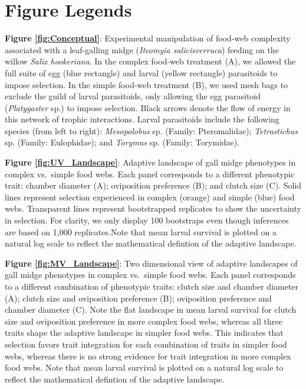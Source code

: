 \documentclass[11pt,]{article}
\begin{document}
\newpage 

\section{Figure Legends}\label{figure-legends}

\textbf{Figure \ref{fig:Conceptual}}: Experimental manipulation of
food-web complexity associated with a leaf-galling midge (\emph{Iteomyia
salicisverruca}) feeding on the willow \emph{Salix hookeriana}. In the
complex food-web treatment (A), we allowed the full suite of egg (blue
rectangle) and larval (yellow rectangle) parasitoids to impose
selection. In the simple food-web treatment (B), we used mesh bags to
exclude the guild of larval parasitoids, only allowing the egg
parasitoid (\emph{Platygaster} sp.) to impose selection. Black arrows
denote the flow of energy in this network of trophic interactions.
Larval parasitoids include the following species (from left to right):
\emph{Mesopolobus} sp. (Family: Pteromalidae); \emph{Tetrastichus} sp.
(Family: Eulophidae); and \emph{Torymus} sp. (Family: Torymidae).

\textbf{Figure \ref{fig:UV_Landscape}}: Adaptive landscape of gall midge
phenotypes in complex vs.~simple food webs. Each panel corresponds to a
different phenotypic trait: chamber diameter (A); oviposition preference
(B); and clutch size (C). Solid lines represent selection experienced in
complex (orange) and simple (blue) food webs. Transparent lines
represent bootstrapped replicates to show the uncertainty in selection.
For clarity, we only display 100 bootstraps even though inferences are
based on 1,000 replicates.Note that mean larval survival is plotted on a
natural log scale to reflect the mathematical defintion of the adaptive
landscape.

\textbf{Figure \ref{fig:MV_Landscape}}: Two dimensional view of adaptive
landscapes of gall midge phenotypes in complex vs.~simple food webs.
Each panel corresponds to a different combination of phenotypic traits:
clutch size and chamber diameter (A); clutch size and oviposition
preference (B); oviposition preference and chamber diameter (C). Note
the flat landscape in mean larval survival for clutch size and
oviposition preference in more complex food webs, whereas all three
traits shape the adaptive landscape in simpler food webs. This indicates
that selection favors trait integration for each combination of traits
in simpler food webs, whereas there is no strong evidence for trait
integration in more complex food webs. Note that mean larval survival is
plotted on a natural log scale to reflect the mathematical defintion of
the adaptive landscape.
\end{document}
